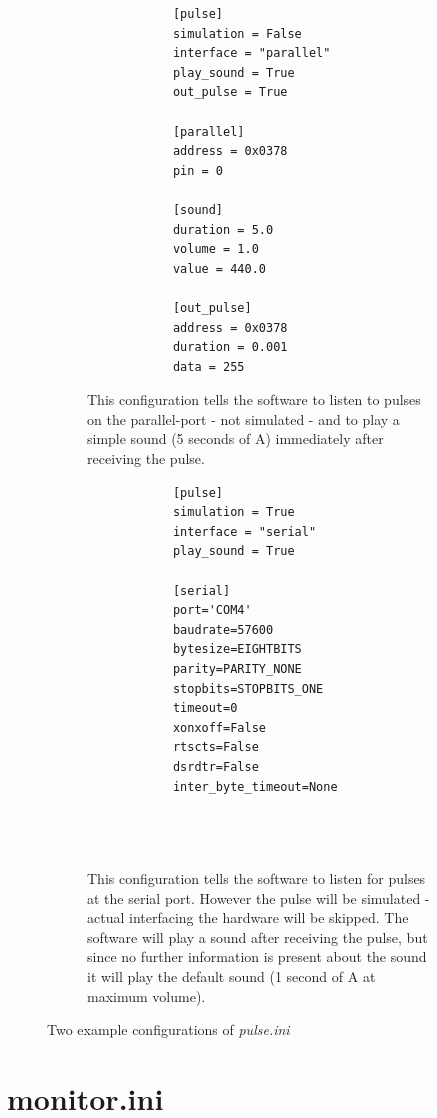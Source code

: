 \documentclass[12pt,a4paper]{book}
\begin{document}
\begin{figure}
	\centering
	\begin{subfigure}[t]{0.4\linewidth}
		\begin{framed}
			\begin{verbatim}
			[pulse]
			simulation = False
			interface = "parallel"
			play_sound = True
			out_pulse = True

			[parallel]
			address = 0x0378
			pin = 0

			[sound]
			duration = 5.0
			volume = 1.0
			value = 440.0
			
			[out_pulse]
			address = 0x0378
			duration = 0.001
			data = 255			
			\end{verbatim}
		\end{framed}
		\caption{This configuration tells the software to listen to pulses on the parallel-port - not simulated - and to play a simple sound (5 seconds of A) immediately after receiving the pulse.}
		\label{fig:pulseiniparallel}
	\end{subfigure}
	\quad
	\begin{subfigure}[t]{0.4\linewidth}
		\begin{framed}%
			\begin{verbatim}
			[pulse]
			simulation = True
			interface = "serial"
			play_sound = True
			
			[serial]
			port='COM4'
			baudrate=57600
			bytesize=EIGHTBITS
			parity=PARITY_NONE
			stopbits=STOPBITS_ONE
			timeout=0
			xonxoff=False
			rtscts=False
			dsrdtr=False
			inter_byte_timeout=None
			
			
			
			\end{verbatim}
		\end{framed}
		\caption{This configuration tells the software to listen for pulses at the serial port. However the pulse will be simulated - actual interfacing the hardware will be skipped. The software will play a sound after receiving the pulse, but since no further information is present about the sound it will play the default sound (1 second of A at maximum volume).}
		\label{fig:pulseiniserial}
	\end{subfigure}
	
	\caption{Two example configurations of \textit{pulse.ini}}
	
\end{figure}

\section{monitor.ini}\label{sec:monitorini}
\end{document}
